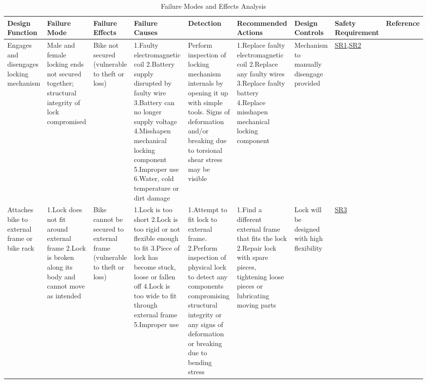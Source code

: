\documentclass{article}
\begin{document}
\begin{table}[H]
\caption{Failure Modes and Effects Analysis}
\tiny
\begin{tabular}{| p{} | p{}  | p{} | p{} | p{} | p{} | p{} | p{} | p{} |}
\hline
\textbf{Design Function} & \textbf{Failure Mode} & \textbf{Failure Effects} & \textbf{Failure Causes} & \textbf{Detection} & \textbf{Recommended Actions} & \textbf{Design Controls} & \textbf{Safety Requirement} & \textbf{Reference} \\ \hline
Engages and disengages locking mechanism & Male and female locking ends not secured together; structural integrity of lock compromised & Bike not secured (vulnerable to theft or loss) & 1.Faulty electromagnetic coil \newline 2.Battery supply disrupted by faulty wire \newline 3.Battery can no longer supply voltage \newline 4.Misshapen mechanical locking component \newline 5.Improper use \newline 6.Water, cold temperature or dirt damage & Perform inspection of locking mechanism internals by opening it up with simple tools. Signs of deformation and/or breaking due to torsional shear stress may be visible & 1.Replace faulty electromagnetic coil \newline 2.Replace any faulty wires \newline 3.Replace faulty battery \newline 4.Replace misshapen mechanical locking component & Mechanism to manually disengage provided & \hyperref[SR1]{SR1},\hyperref[SR2]{SR2} &  \\ \hline

Attaches bike to external frame or bike rack & 1.Lock does not fit around external frame  \newline 2.Lock is broken along its body and cannot move as intended & Bike cannot be secured to external frame (vulnerable to theft or loss) & 1.Lock is too short \newline 2.Lock is too rigid or not flexible enough to fit \newline 3.Piece of lock has become stuck, loose or fallen off \newline 4.Lock is too wide to fit through external frame \newline 5.Improper use & 1.Attempt to fit lock to external frame.  \newline 2.Perform inspection of physical lock to detect any components compromising structural integrity or any signs of deformation or breaking due to bending stress & 1.Find a different external frame that fits the lock \newline 2.Repair lock with spare pieces, tightening loose pieces or lubricating moving parts & Lock will be designed with high flexibility & \hyperref[SR3]{SR3}  &  \\ \hline


\end{tabular}
\end{table}
\end{document}
